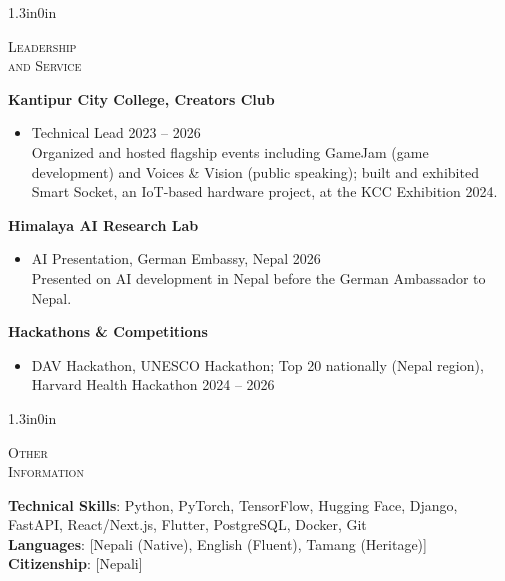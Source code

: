 \documentclass[11pt]{article}
\newcommand{\cvlabel}[1]{\hspace*{-1.3in}\parbox[t][\baselineskip][t]{1.05in}{\raggedright\scshape #1\par}\hspace{0.25in}}
\newenvironment{cvsection}[1]{%
  \begin{adjustwidth}{1.3in}{0in}\noindent\cvlabel{#1}%
}{%
  \end{adjustwidth}\vspace{10pt}
}
\begin{document}
\begin{cvsection}{Leadership\\and Service}
\textbf{Kantipur City College, Creators Club} \\
\begin{itemize}
  \item Technical Lead \hfill 2023 -- 2026 \\
  Organized and hosted flagship events including GameJam (game development) and Voices \& Vision (public speaking); built and exhibited Smart Socket, an IoT-based hardware project, at the KCC Exhibition 2024.
\end{itemize}
\textbf{Himalaya AI Research Lab} \\
\begin{itemize}
  \item AI Presentation, German Embassy, Nepal \hfill 2026 \\
  Presented on AI development in Nepal before the German Ambassador to Nepal.
\end{itemize}
\textbf{Hackathons \& Competitions} \\
\begin{itemize}
  \item DAV Hackathon, UNESCO Hackathon; Top 20 nationally (Nepal region), Harvard Health Hackathon \hfill 2024 -- 2026
\end{itemize}
\end{cvsection}

\begin{cvsection}{Other\\Information}
\textbf{Technical Skills}: Python, PyTorch, TensorFlow, Hugging Face, Django, FastAPI, React/Next.js, Flutter, PostgreSQL, Docker, Git \\
\textbf{Languages}: [Nepali (Native), English (Fluent), Tamang (Heritage)] \\
\textbf{Citizenship}: [Nepali]
\end{cvsection}
\end{document}

